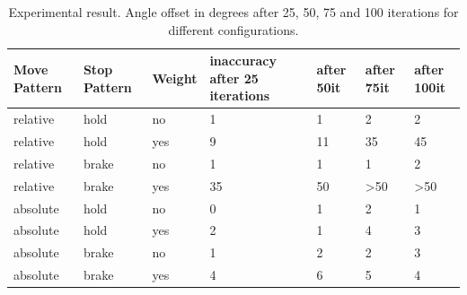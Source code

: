 \documentclass[11pt, a4paper]{article}
\begin{document}
	
	\begin{table}[H]
		\centering
		\begin{tabular}{|l|l|l|l|l|l|l|}
			\hline
			Move Pattern & Stop Pattern & Weight & inaccuracy after 25 iterations & after 50it & after 75it             & after 100it            \\ \hline \hline
			relative   & hold         & no     & 1\degree             & 1\degree    & 2\degree                & 2\degree                \\ \hline
			relative   & hold         & yes    & 9\degree             & 11\degree   & 35\degree               & 45\degree               \\ \hline
			relative   & brake        & no     & 1\degree             & 1\degree    & 1\degree                & 2\degree                \\ \hline
			relative   & brake        & yes    & 35\degree            & 50\degree   & \textgreater{}50\degree & \textgreater{}50\degree \\ \hline
			absolute     & hold         & no     & 0\degree             & 1\degree    & 2\degree                & 1\degree                \\ \hline
			absolute     & hold         & yes    & 2\degree             & 1\degree    & 4\degree                & 3\degree                \\ \hline
			absolute     & brake        & no     & 1\degree             & 2\degree    & 2\degree                & 3\degree                \\ \hline
			absolute     & brake        & yes    & 4\degree             & 6\degree    & 5\degree                & 4\degree                \\ \hline
		\end{tabular}
		\caption{Experimental result. Angle offset in degrees after 25, 50, 75 and 100 iterations for different configurations.}
		\label{tab:angle_experiment}
	\end{table}
	
	
\end{document}
